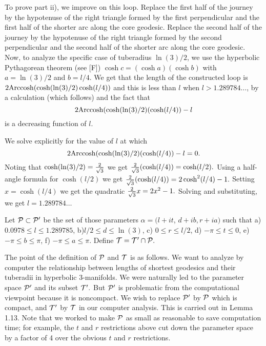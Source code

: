 To prove part ii), we improve on this loop.  
Replace the first half of the journey by the
hypotenuse of the right triangle formed by the first perpendicular and the
first half of the shorter arc along the core geodesic.  Replace the second
half of the journey by the hypotenuse of the right triangle formed by the
second perpendicular and the second half of the shorter arc along the core
geodesic.  
Now, to analyze the specific case of tuberadius $\ln(3)/2$, we use
the hyperbolic Pythagorean theorem (see [F]) 
$\cosh c = (\cosh a)
( \cosh b)$ with $a = \ln(3)/2$ and $b = l/4.$ 
We get that the length of the
constructed loop is $2 {\rm Arccosh} (\cosh(\ln(3)/2) \cosh (l/4))$ and this is
less than $l$ when $l > 1.289784\ldots$, 
by a calculation (which follows) and the fact that $$2 {\rm Arccosh} (\cosh(\ln(3)/2) (\cosh (l/4)) - l$$ is a decreasing function of $l$.

We solve explicitly for the value of $l$ at which
$$2 {\rm Arccosh} (\cosh(\ln(3)/2) (\cosh (l/4)) - l = 0.$$  Noting that
$\cosh(\ln(3)/2) = {2 \over \sqrt 3}$ we get ${2 \over \sqrt 3}(\cosh (l/4)) 
= \cosh(l/2).$  Using a half-angle formula for $\cosh(l/2)$ we get ${2
\over \sqrt 3}(\cosh (l/4))  = 2\cosh^2(l/4) - 1.$  Setting $x =
\cosh(l/4)$ we get the quadratic ${2 \over \sqrt 3} x = 2 x^2 -1.$
Solving and substituting, we get $l = 1.289784\ldots$ \enddemo

 \hglue-8pt Let ${\cal P}\subset{\cal P}^{\prime}$ be the set of those parameters $\alpha
= (l+it$, $d+ib, r+ia)$ such
that
 a)       $0.0978\le l \le 1.289785$,
 b)\enspace      $l/2 \le d\le \ln(3)$,
 c) \enspace   $0\le r \le l/2$,
 d) \enspace      $-\pi \le t \le 0$,
 e) \enspace	$-\pi \le b \le \pi$,
 f) \enspace	$-\pi \le a \le \pi$.
\noindent 
Define ${\cal T}={\cal T}^{\prime}\cap {\cal P}.$
\enddemo

The point of the definition of ${\cal P}$ and ${\cal T}$ is as follows.  We want to analyze by computer the relationship between lengths of shortest geodesics  and their tuberadii in hyperbolic $3$-manifolds.  We were naturally led to the parameter space 
${\cal P}^{\prime}$ and its subset ${\cal T}^{\prime}.$  But 
${\cal P}^{\prime}$ is problematic from the computational viewpoint because it is noncompact.  We wish to replace 
${\cal P}^{\prime}$ by ${\cal P}$ which is compact, and 
${\cal T}^{\prime}$ by ${\cal T}$ in our computer analysis.  This is carried out in Lemma 1.13.  Note that we worked to make ${\cal P}$ as small as reasonable to save computation time;  for example, the $t$ and $r$ restrictions above cut down the parameter space by a factor of 4 over the obvious $t$ and $r$ restrictions. 

